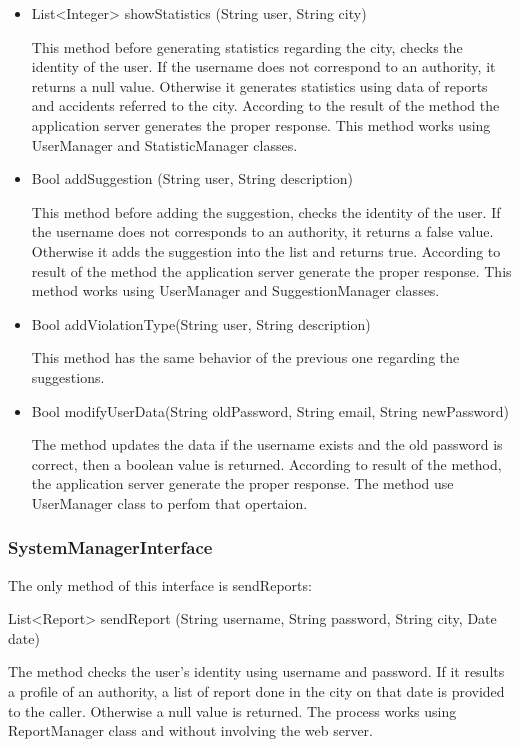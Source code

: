 \begin{itemize}
	 \item
	List<Integer> showStatistics (String user, String city)
	
	This method before generating statistics regarding the city, checks the identity of the user. 
	If the username does not correspond to an authority, it returns a null value.
	Otherwise it generates statistics using data of reports and accidents referred to the city.
	According to the result of the method the application server generates the proper response.
	This method works using UserManager and StatisticManager classes.
	
	\item 
	Bool addSuggestion (String user, String description)
	
	This method before adding the suggestion, checks the identity of the user. 
	If the username does not corresponds to an authority, it returns a false value.
	Otherwise it adds the suggestion into the list and returns true.
	According to result of the method the application server generate the proper response.
	This method works using UserManager and SuggestionManager classes.
	
	\item 
	Bool addViolationType(String user, String description)
	
	This method has the same behavior of the previous one regarding the suggestions.
	
	\item 
	Bool modifyUserData(String oldPassword, String email, String newPassword)
	
	The method updates the data if the username exists and the old password is correct, then
	a boolean value is returned. According to result of the method, the application server generate the proper response.
	The method use UserManager class to perfom that opertaion.
\end{itemize}

\subsubsection{SystemManagerInterface}

The only method of this interface is sendReports:
\hfill

List<Report> sendReport (String username, String password, String city, Date date)



The method checks the user's identity using username and password. If it results a profile of an authority, a list of report done in the city on that date is provided to the caller. Otherwise a null value is returned.
The process works using ReportManager class and without involving the web server.


